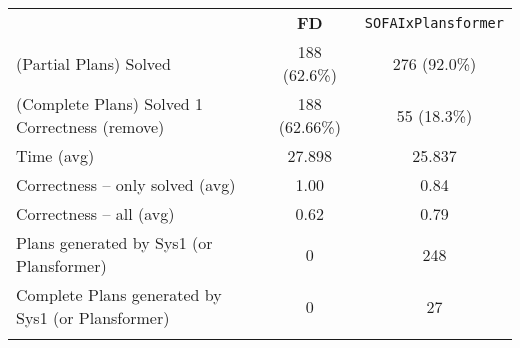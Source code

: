 \documentclass[12pt,a4paper]{standalone}
\begin{document}
	
	
	\begin{tabular}{||l|c|c||}
		\hhline{|t:===:t|}
		& \footnotesize{\textbf{FD}}  & \texttt{SOFAIxPlansformer}  \\
		\hhline{||---||}
		(Partial Plans) Solved   & 188 (62.6\%) & 276 (92.0\%)    \\
		\hhline{||---||}
		(Complete Plans) Solved 1 Correctness (remove)   & 188 (62.66\%) & 55 (18.3\%)        \\
		\hhline{||---||}
		Time (avg)  & 27.898  & 25.837   \\
		\hhline{||---||}
		Correctness -- only solved (avg)   & 1.00       & 0.84   \\
		\hhline{||---||}
		Correctness -- all (avg)   & 0.62      & 0.79    \\
		\hhline{||---||}
		Plans generated by Sys1 (or Plansformer)   & 0       & 248 \\
		\hhline{||---||}
		Complete Plans generated by Sys1 (or Plansformer) & 0       & 27      \\
		\hhline{|b:===:b|}
	\end{tabular}
	
\end{document}
